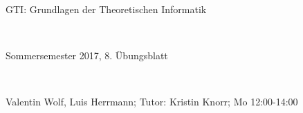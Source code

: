 \documentclass{article}
\begin{document}
	
	\setlength{\parindent}{0em} 
	
	\hrulefill
	\begin{center}
		\bfseries %
		\sffamily %
		\begin{huge}
			GTI: Grundlagen der Theoretischen Informatik
		\end{huge}\\
		\begin{Large}
			Sommersemester 2017, 8. Übungsblatt
		\end{Large}\\
		\begin{small}
			Valentin Wolf, Luis Herrmann; Tutor: Kristin Knorr; Mo 12:00-14:00
		\end{small}
		
		\vspace{-10pt}
	\end{center}
	\hrulefill
	
\end{document}
